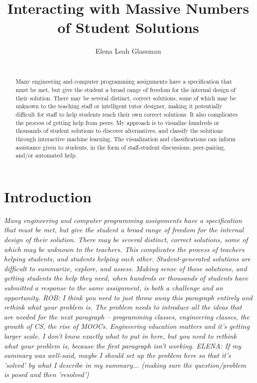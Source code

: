\documentclass{sigchi}
\begin{document}
\title{Interacting with Massive Numbers of Student Solutions}

\author{
  \alignauthor Elena Leah Glassman\\
    \\
}

\maketitle

\begin{abstract}
Many engineering and computer programming assignments have a specification that must be met, but give the student a broad range of freedom for the internal design of their solution. There may be several distinct, correct solutions, some of which may be unknown to the teaching staff or intelligent tutor designer, making it potentially difficult for staff to help students reach their own correct solutions. It also complicates the process of getting help from peers. My approach is to visualize hundreds or thousands of student solutions to discover alternatives, and classify the solutions through interactive machine learning. The visualization and classifications can inform assistance given to students, in the form of staff-student discussions, peer-pairing, and/or automated help.
\end{abstract}



\section{Introduction}

{\it Many engineering and computer programming assignments have a specification that must be met, but give the student a broad range of freedom for the internal design of their solution. There may be several distinct, correct solutions, some of which may be unknown to the teachers. This complicates the process of teachers helping students, and students helping each other. Student-generated solutions are difficult to summarize, explore, and assess. Making sense of those solutions, and getting students the help they need, when hundreds or thousands of students have submitted a response to the same assignment, is both a challenge and an opportunity. ROB: I think you need to just throw away this paragraph entirely and rethink what your problem is. The problem needs to introduce all the ideas that are needed for the next paragraph -- programming classes, engineering classes, the growth of CS, the rise of MOOCs. Engineering education matters and it's getting larger scale. I don't know exactly what to put in here, but you need to rethink what your problem is, because the first paragraph isn't working. ELENA: If my summary was well-said, maybe I should set up the problem here so that it's 'solved' by what I describe in my summary... (making sure the question/problem is posed and then 'resolved')}
\end{document}
